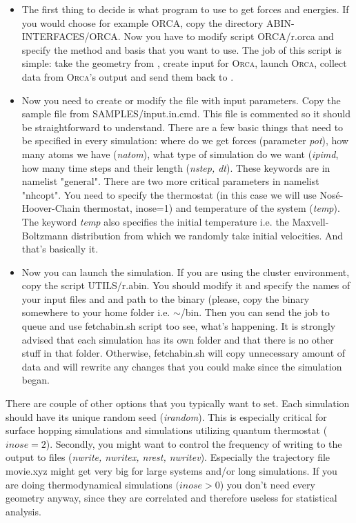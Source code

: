 \documentclass[12pt,a4paper]{article}
\begin{document}
\begin{itemize}

\item The first thing to decide is what program to use to get forces and energies. If you would choose for example ORCA, copy the directory
ABIN-INTERFACES/ORCA. Now you have to modify script ORCA/r.orca and specify the method and basis that you want to use. The job of this script is simple: take the geometry from \abin, create input for \textsc{Orca}, launch \textsc{Orca}, collect data from \textsc{Orca}'s output and send them back to \abin.  
\item Now you need to create or modify the file with input parameters. Copy the sample file from SAMPLES/input.in.cmd.
This file is commented so it should be straightforward to understand. There are a few basic things that need to be specified in every simulation: where do we get forces (parameter \textit{pot}), how many atoms we have (\textit{natom}), what type of simulation do we want (\textit{ipimd}, how many time steps and their length (\textit{nstep, dt}). These keywords are in namelist "general". There are two more critical parameters in namelist "nhcopt". You need to specify the thermostat (in this case we will use Nosé-Hoover-Chain thermostat, inose=1)
and temperature of the system (\textit{temp}). The keyword \textit{temp} also specifies the initial temperature i.e. the Maxvell-Boltzmann distribution from which we randomly take initial velocities. And that's basically it.

\item Now you can launch the simulation. If you are using the cluster environment, copy the script UTILS/r.abin.
You should modify it and specify the names of your input files and and path to the \abin binary  (please, copy the binary somewhere to your home folder i.e. $\sim$/bin. Then you can send the job to queue and use fetchabin.sh script too see, what's happening. It is strongly advised that each simulation has its own folder and that there is no other stuff in that folder. Otherwise, fetchabin.sh will copy unnecessary amount of data and will rewrite any changes that you could make since the simulation began. 

\end{itemize}

There are couple of other options that you typically want to set. Each simulation should have its unique random seed (\textit{irandom}). This is especially critical for surface hopping simulations and simulations utilizing quantum thermostat ($inose=2$). Secondly, you might want to control the frequency of writing to the output to files (\textit{nwrite, nwritex, nrest, nwritev}). Especially the trajectory file movie.xyz might get very big for large systems and/or long simulations. If you are doing thermodynamical simulations $(inose > 0$) you don't need every geometry anyway, since they are correlated and therefore useless for statistical analysis.
\end{document}
